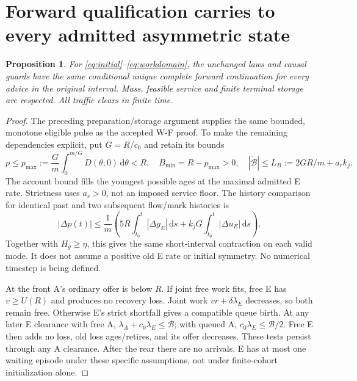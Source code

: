 \documentclass[11pt,a4paper]{article}
\newcommand{\dd}{\,\mathrm d}
\newcommand{\bud}{\mathcal B}
\newtheorem{proposition}{Proposition}
\begin{document}
\section{Forward qualification carries to every admitted asymmetric state}
\begin{proposition}
For \eqref{eq:initial}--\eqref{eq:workdomain}, the unchanged laws and causal
guards have the same conditional unique complete forward continuation for
every advice in the original interval. Mass, feasible service and finite
terminal storage are respected. All traffic clears in finite time.
\end{proposition}
\begin{proof}
The preceding preparation/storage argument supplies the same bounded,
monotone eligible pulse as the accepted W-F proof. To make the remaining
dependencies explicit, put $G=R/c_0$ and retain its bounds
\begin{equation}
 p\leq p_{\max}:=\frac Gm\int_0^{m/G}D(\theta;0)\dd\theta<R,
 \quad B_{\min}=R-p_{\max}>0,\quad
 |\dot{\bud}|\leq L_B:=2GR/m+a_rk_j.
 \label{eq:budgetbounds}
\end{equation}
The account bound fills the youngest possible ages at the maximal admitted
E rate. Strictness uses $a_r>0$, not an imposed service floor. The history
comparison for identical past and two subsequent flow/mark histories is
\begin{equation}
 |\Delta p(t)|\leq\frac1m\left(5R\int_{t_0}^t|\Delta g_E|\dd s
                 +k_jG\int_{t_0}^t|\Delta u_E|\dd s\right).
 \label{eq:volterra}
\end{equation}
Together with $H_g\geq\eta$, this gives the same short-interval contraction
on each valid mode. It does not assume a positive old E rate or initial
symmetry. No numerical timestep is being defined.

At the front A's ordinary offer is below $R$. If joint free work fits, free
E has $v\geq U(R)$ and produces no recovery loss. Joint work
$vr+\delta\lambda_E$ decreases, so both remain free. Otherwise E's strict
shortfall gives a compatible queue birth. At any later E clearance with
free A, $\lambda_A+c_0\lambda_E\leq\bud$; with queued A,
$c_0\lambda_E\leq\bud/2$. Free E then adds no loss, old loss ages/retires,
and its offer decreases. These tests persist through any A clearance.
After the rear there are no arrivals. E has at most one waiting episode
under these specific assumptions, not under finite-cohort initialization
alone.


\end{proof}
\end{document}
